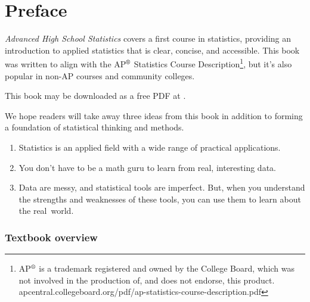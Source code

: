 \chapter*{{\color{oiB}Preface}\vspace{-6mm}}

\noindent%
\emph{Advanced High School Statistics} covers a first course in statistics, providing an introduction to applied statistics that is clear, concise, and accessible. This book was written to align with the AP$^{\text{\textregistered}}$ Statistics Course
Description\footnote{AP$^{\text{\textregistered}}$ is
  a trademark registered and owned by the College Board,
  which was not involved in the production of, and does
  not endorse, this product.
      {apcentral.collegeboard.org/pdf/ap-statistics-course-description.pdf}}, but it's also popular in non-AP courses and community colleges.
\vspace{3mm}

\noindent%
This book may be downloaded as a free PDF at .
\vspace{3mm}

\noindent%
We hope readers will take away three ideas from this book in addition to forming a foundation of statistical thinking and methods.\vspace{-1mm}
\begin{enumerate}
\setlength{\itemsep}{0mm}
\item[(1)] Statistics is an applied field with a wide range of practical applications.
\item[(2)] You don't have to be a math guru to learn from real, interesting data.
\item[(3)] Data are messy, and statistical tools are imperfect. But, when you understand the strengths and weaknesses of these tools, you can use them to learn about the real~world.
\end{enumerate}


\subsection*{{\color{oiB}Textbook overview}}

